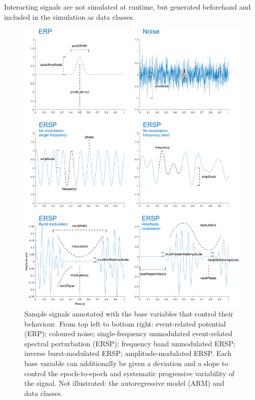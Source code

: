 Interacting signals are not simulated at runtime, but generated beforehand and included in the simulation as data classes.

\begin{figure}
    \centering
    \includegraphics[width=\textwidth]{figures/sereega-signals3x2.png}
    \caption[Sample signals annotated with the base variables that control their behaviour.]{Sample signals annotated with the base variables that control their behaviour. From top left to bottom right: event-related potential (ERP);  coloured noise; single-frequency unmodulated event-related spectral perturbation (ERSP); frequency band unmodulated ERSP; inverse burst-modulated ERSP; amplitude-modulated ERSP. Each base variable can additionally be given a deviation and a slope to control the epoch-to-epoch and systematic progressive variability of the signal. Not illustrated: the autoregressive model (ARM) and data classes.}
    \label{fig:sereega:signals}
\end{figure}



